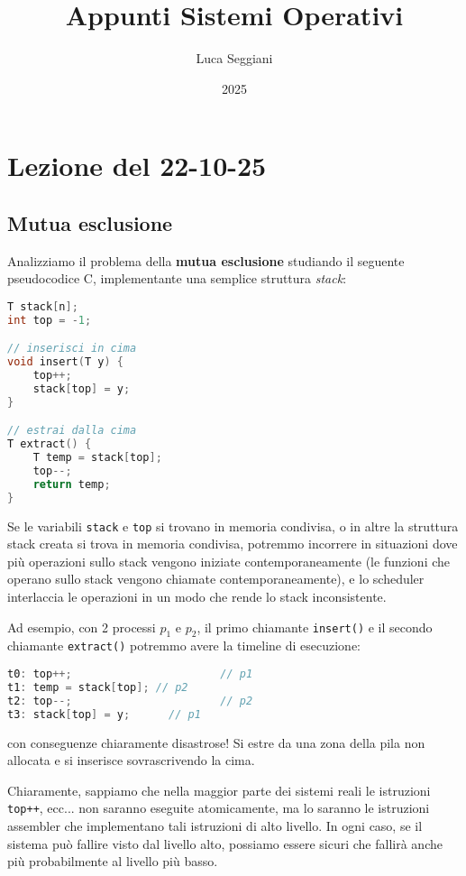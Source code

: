 \documentclass[a4paper,11pt]{article}
\title{Appunti Sistemi Operativi}
\author{Luca Seggiani}
\date{2025}
\begin{document}
\section{Lezione del 22-10-25}

\thispagestyle{empty}
\pagestyle{fancy}

\subsection{Mutua esclusione}
Analizziamo il problema della \textbf{mutua esclusione} studiando il seguente pseudocodice C, implementante una semplice struttura \textit{stack}:
\begin{lstlisting}[language=C++, style=codestyle]	
T stack[n];
int top = -1;

// inserisci in cima
void insert(T y) {
	top++;
	stack[top] = y;
}

// estrai dalla cima
T extract() {
	T temp = stack[top];
	top--;
	return temp;
}
\end{lstlisting}

Se le variabili \lstinline|stack| e \lstinline|top| si trovano in memoria condivisa, o in altre la struttura stack creata si trova in memoria condivisa, potremmo incorrere in situazioni dove più operazioni sullo stack vengono iniziate contemporaneamente (le funzioni che operano sullo stack vengono chiamate contemporaneamente), e lo scheduler interlaccia le operazioni in un modo che rende lo stack inconsistente.

Ad esempio, con 2 processi $p_1$ e $p_2$, il primo chiamante \lstinline|insert()| e il secondo chiamante \lstinline|extract()| potremmo avere la timeline di esecuzione:
\begin{lstlisting}[language=C++, style=codestyle]	
t0: top++; 						 // p1
t1: temp = stack[top]; // p2
t2: top--; 						 // p2
t3: stack[top] = y; 	 // p1
\end{lstlisting}
con conseguenze chiaramente disastrose! Si estre da una zona della pila non allocata e si inserisce sovrascrivendo la cima.

Chiaramente, sappiamo che nella maggior parte dei sistemi reali le istruzioni \lstinline|top++|, ecc... non saranno eseguite atomicamente, ma lo saranno le istruzioni assembler che implementano tali istruzioni di alto livello. In ogni caso, se il sistema può fallire visto dal livello alto, possiamo essere sicuri che fallirà anche più probabilmente al livello più basso.

\par\smallskip
\end{document}
